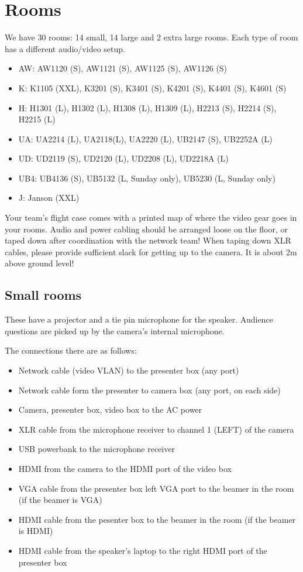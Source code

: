 \documentclass{article}
\begin{document}
\section{Rooms}
We have 30 rooms: 14 small, 14 large and 2 extra large rooms. Each type of room has a different audio/video setup.
\begin{itemize}
  \item AW: AW1120 (S), AW1121 (S), AW1125 (S), AW1126 (S)
  \item K: K1105 (XXL), K3201 (S), K3401 (S), K4201 (S), K4401 (S), K4601 (S)
  \item H: H1301 (L), H1302 (L), H1308 (L), H1309 (L), H2213 (S), H2214 (S), H2215 (L)
  \item UA: UA2214 (L), UA2118(L), UA2220 (L), UB2147 (S), UB2252A (L)
  \item UD: UD2119 (S), UD2120 (L), UD2208 (L), UD2218A (L)
  \item UB4: UB4136 (S), UB5132 (L, Sunday only), UB5230 (L, Sunday only)
  \item J: Janson (XXL)
\end{itemize}

Your team's flight case comes with a printed map of where the video gear goes in your rooms. Audio and power cabling should be arranged loose on the floor, or taped down after coordination with the network team! When taping down XLR cables, please provide sufficient slack for getting up to the camera. It is about 2m above ground level!

\subsection{Small rooms}
These have a projector and a tie pin microphone for the speaker. Audience questions are picked up by the camera's internal microphone.

The connections there are as follows:

\begin{itemize}
  \item Network cable (video VLAN) to the presenter box (any port)
  \item Network cable form the presenter to camera box (any port, on each side)
  \item Camera, presenter box, video box to the AC power
  \item XLR cable from the microphone receiver to channel 1 (LEFT) of the camera
  \item USB powerbank to the microphone receiver
  \item HDMI from the camera to the HDMI port of the video box
  \item VGA cable from the presenter box left VGA port to the beamer in the room (if the beamer is VGA)
  \item HDMI cable from the pesenter box to the beamer in the room (if the beamer is HDMI)
  \item HDMI cable from the speaker's laptop to the right HDMI port of the presenter box
\end{itemize}
\end{document}
